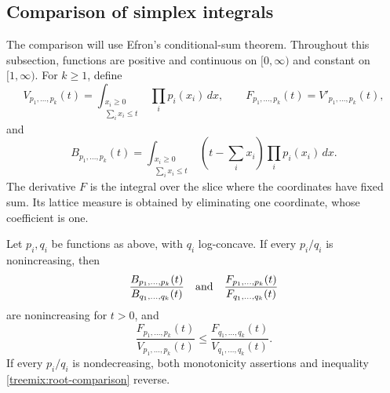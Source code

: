 \subsection{Comparison of simplex integrals}

The comparison will use Efron's conditional-sum theorem. Throughout
this subsection, functions are positive and continuous on $[0,\infty)$
and constant on $[1,\infty)$. For $k\ge1$, define
\[
 V_{p_1,\ldots,p_k}(t)=
 \int_{\substack{x_i\ge0\\\sum_i x_i\le t}}\prod_i p_i(x_i)\,dx,
 \qquad F_{p_1,\ldots,p_k}(t)=V'_{p_1,\ldots,p_k}(t),
\]
and
\[
 B_{p_1,\ldots,p_k}(t)=
 \int_{\substack{x_i\ge0\\\sum_i x_i\le t}}
       (t-\textstyle\sum_i x_i)\prod_i p_i(x_i)\,dx.
\]
The derivative $F$ is the integral over the slice where the coordinates
have fixed sum. Its lattice measure is obtained by eliminating one
coordinate, whose coefficient is one.

\begin{lemma}\label{treemix:convolution}
Let $p_i,q_i$ be functions as above, with $q_i$ log-concave. If every
$p_i/q_i$ is nonincreasing, then
\[
 \frac{B_{p_1,\ldots,p_k}(t)}{B_{q_1,\ldots,q_k}(t)}
 \quad\hbox{and}\quad
 \frac{F_{p_1,\ldots,p_k}(t)}{F_{q_1,\ldots,q_k}(t)}
\]
are nonincreasing for $t>0$, and
\begin{equation}\label{treemix:root-comparison}
 \frac{F_{p_1,\ldots,p_k}(t)}{V_{p_1,\ldots,p_k}(t)}
 \le\frac{F_{q_1,\ldots,q_k}(t)}{V_{q_1,\ldots,q_k}(t)}.
\end{equation}
If every $p_i/q_i$ is nondecreasing, both monotonicity assertions and
inequality \eqref{treemix:root-comparison} reverse.
\end{lemma}

